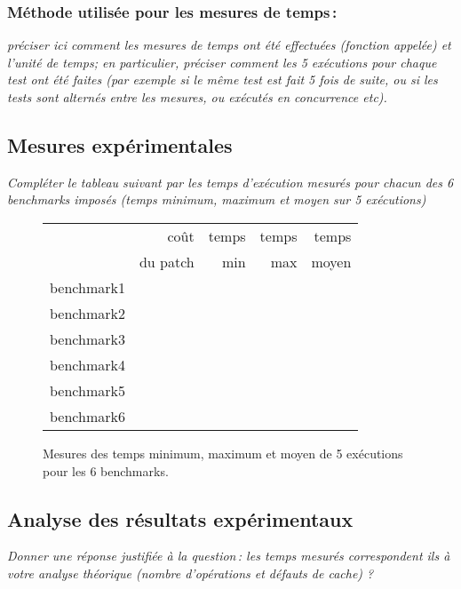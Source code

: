 \documentclass[a4paper, 10pt, french]{article}
\begin{document}
	\subsubsection{Méthode utilisée pour les mesures de temps\,: } 
	  {\em préciser ici  comment les mesures de temps ont été effectuées (fonction appelée) et l'unité de temps; en particulier, 
	   préciser comment les 5 exécutions pour chaque test ont été faites (par exemple si le même test est fait 5 fois de suite, ou si les tests sont alternés entre
	   les mesures, ou exécutés en concurrence etc). 
	  }

  \subsection{Mesures expérimentales}
	{\em Compléter le tableau suivant par les temps d'exécution mesurés pour chacun des 6 benchmarks imposés
			  (temps minimum, maximum et moyen sur 5 exécutions)
	}

	\begin{figure}[h]
		\begin{center}
			\begin{tabular}{|l||r||r|r|r||}
				\hline
				\hline
				& coût         & temps     & temps   & temps \\
				& du patch     & min       & max     & moyen \\
				\hline
				\hline
				benchmark1 &      &     &     &     \\
				\hline
				benchmark2 &      &     &     &     \\
				\hline
				benchmark3 &      &     &     &     \\
				\hline
				benchmark4 &      &     &     &     \\
				\hline
				benchmark5 &      &     &     &     \\
				\hline
				benchmark6 &      &     &     &     \\
				\hline
				\hline
			\end{tabular}
			\caption{Mesures des temps minimum, maximum et moyen de 5 exécutions pour les 6 benchmarks.}
			\label{table-temps}
		\end{center}
	\end{figure}

\subsection{Analyse des résultats expérimentaux}
{\em Donner  une réponse justifiée  à la question\,: 
			  les  temps mesurés correspondent ils  à votre analyse théorique (nombre d’opérations et défauts de cache) ?
}
\end{document}
